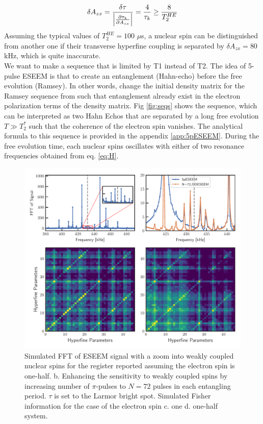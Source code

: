 \documentclass[%
 reprint,
superscriptaddress,
 amsmath,amssymb,
 aps,
]{revtex4-2}
\begin{document}
\begin{gather}
	\delta A_{zx} = \frac{\delta \tau}{\abs{\frac{\partial \tau_k}{\partial A_{zx}}}} = \frac{4}{\tau_k} \ge \frac{8}{T_2^{HE}}
\end{gather}
Assuming the typical values of $T_2^{HE} = 100 $ $\mu$s, a nuclear spin can be distinguished from another one if their transverse hyperfine coupling is separated by $\delta A_{zx} = 80$ kHz, which is quite inaccurate.\\

   
We want to make a sequence that is limited by T1 instead of T2. The idea of 5-pulse ESEEM \cite{kasumaj20085} is that to create an entanglement (Hahn-echo) before the free evolution (Ramsey). In other words, change the initial density matrix for the Ramsey sequence from such that entanglement already exist in the electron polarization terms of the density matrix. Fig \ref{fig:seqs} shows the sequence, which can be interpreted as two Hahn Echos that are separated by a long free evolution $T\gg T_2^\ast$ such that the coherence of the electron spin vanishes. The analytical formula to this sequence is provided in the appendix \ref{app:5pESEEM}. During the free evolution time, each nuclear spins oscillates with either of two resonance frequencies obtained from eq. \ref{eq:H}.
\begin{figure}[htbp]
	\begin{center}
		\includegraphics[width=0.9\columnwidth]{pict/eseem_compare2.pdf}
		\caption{Simulated FFT of ESEEM signal with a zoom into weakly coupled nuclear spins for the register reported \cite{abobeih2019atomic} assuming the electron spin is one-half. b. Enhancing the sensitivity to weakly coupled spins by increasing number of $\pi$-pulses to $N=72$ pulses in each entangling period. $\tau$ is set to the Larmor bright spot. Simulated Fisher information for the case of the electron spin c. one d. one-half system.}
		\label{fig:4}
	\end{center}
\end{figure}
\end{document}
